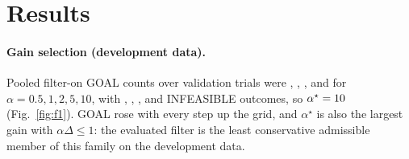 \documentclass[11pt]{article}
\begin{document}
\section{Results}\label{sec:results}
\paragraph{Gain selection (development data).} Pooled filter-on GOAL counts over \SelN{} validation
trials were \SelGoalhalf, \SelGoalone, \SelGoaltwo, \SelGoalfive{} and \SelGoalten{} for
$\alpha=0.5,1,2,5,10$, with \SelInfhalf, \SelInfone, \SelInftwo, \SelInffive{} and \SelInften{}
INFEASIBLE outcomes, so $\alpha^\star=\AlphaStar$ (Fig.~\ref{fig:f1}). GOAL rose with every step up
the grid, and $\alpha^\star$ is also the largest gain with $\alpha\Delta\le1$: the evaluated filter is
the least conservative admissible member of this family on the development data.

\begin{table}[t]
\centering\small
\caption{Confirmatory results, filter on ($\alpha^\star=\AlphaStar$) versus filter off, nine actors
pooled, \PairsPerDensity{} pairs per density. Differences in percentage points (pp); one-sided bounds
at 98.33\%; 95\% intervals descriptive.}
\label{tab:conf}
\end{table}
\end{document}
